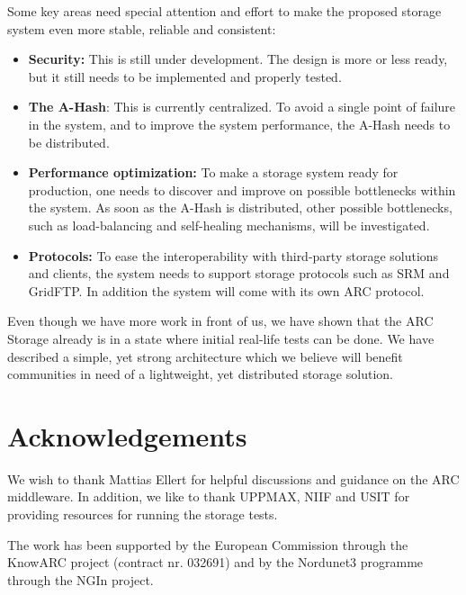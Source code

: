 \documentclass[final]{ieee}
\begin{document}
Some key areas need special attention and effort to make the proposed
storage system even more stable, reliable and consistent:
\begin{itemize}
\item \textbf{Security:} This is still under development. The design is more
  or less ready, but it still needs to be implemented and properly
  tested.
\item \textbf{The A-Hash}: This is currently centralized. To avoid a single
  point of failure in the system, and to improve the system
  performance, the A-Hash needs to be distributed.
\item \textbf{Performance optimization:} To make a storage system
  ready for production, one needs to discover and improve on
  possible bottlenecks within the system. As soon as the A-Hash is
  distributed, other possible bottlenecks, such as load-balancing
  and self-healing mechanisms, will be investigated.
\item \textbf{Protocols:} To ease the interoperability with third-party
  storage solutions and clients, the system needs to support storage
  protocols such as SRM and GridFTP. In addition the system will come
  with its own ARC protocol.
\end{itemize}

Even though we have more work in front of us, we have shown that the
ARC Storage already is in a state where initial real-life tests can be
done. We have described a simple, yet strong architecture which we
believe will benefit communities in need of a lightweight,
yet distributed storage solution.


\section{Acknowledgements}
\label{Acknowledgements}

We wish to thank Mattias Ellert for helpful discussions and guidance
on the ARC middleware. In addition, we like to thank UPPMAX, NIIF and USIT for
providing resources for running the storage tests.

The work has been supported by the European Commission through the KnowARC
project (contract nr. 032691) and by the Nordunet3 programme through the NGIn
project.

\end{document}
